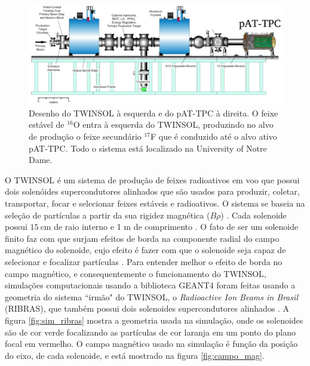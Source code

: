\documentclass[a4paper,12pt,oneside]{book}
\begin{document}

\begin{figure}[H]
    \centering
    \includegraphics[scale = 0.35]{figs/poster3.jpeg}
    \caption{Desenho do TWINSOL à esquerda e do pAT-TPC à direita. O feixe estável de $^{16}$O entra à esquerda do TWINSOL, produzindo no alvo de produção o feixe secundário $^{17}$F que é conduzido até o alvo ativo pAT-TPC. Todo o sistema está localizado na University of Notre Dame.}
    \label{fig:twinsol+pattpc}
\end{figure}

\par O TWINSOL é um sistema de produção de feixes radioativos em voo que possui dois solenóides supercondutores alinhados que são usados para produzir, coletar, transportar, focar e selecionar feixes estáveis e radioativos. O sistema se baseia na seleção de partículas a partir da sua rigidez magnética ($B\rho$) \cite{twinsol, ribras_leo, zamora_mater}. Cada solenoide possui $15~\text{cm}$ de raio interno e 1 m de comprimento \cite{twinsol}. O fato de ser um solenoide finito faz com que surjam efeitos de borda na componente radial do campo magnético do solenoide, cujo efeito é fazer com que o solenoide seja capaz de selecionar e focalizar partículas \cite{ribras_leo}. Para entender melhor o efeito de borda no campo magnético, e consequentemente o funcionamento do TWINSOL, simulações computacionais usando a biblioteca GEANT4 \cite{geant4} foram feitas usando a geometria do sistema ``irmão" do TWINSOL, o \textit{Radioactive Ion Beams in Brasil} (RIBRAS), que também possui dois solenoides supercondutores alinhados \cite{ribras_leo, ribras}. A figura \ref{fig:sim_ribras} mostra a geometria usada na simulação, onde os solenoides são de cor verde focalizando as partículas de cor laranja em um ponto do plano focal em vermelho. O campo magnético usado na simulação é função da posição do eixo, de cada solenoide, e está mostrado na figura \ref{fig:campo_mag}.
\end{document}
